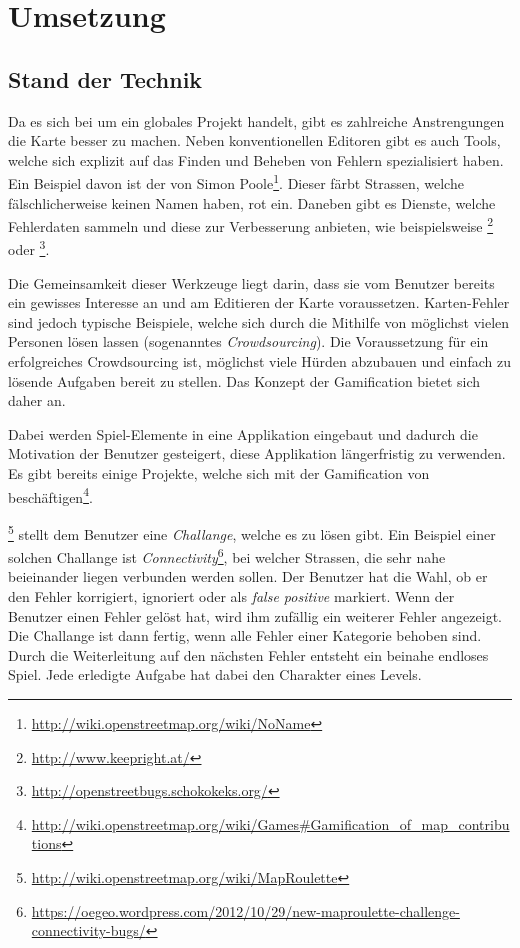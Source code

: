 \chapter{Umsetzung}
\label{umsetzung}

\section{Stand der Technik}
Da es sich bei  um ein globales Projekt handelt, gibt es zahlreiche Anstrengungen die Karte besser zu machen.
Neben konventionellen Editoren gibt es auch Tools, welche sich explizit auf das Finden und Beheben von Fehlern spezialisiert haben.
Ein Beispiel davon ist der  von Simon Poole\footnote{\url{http://wiki.openstreetmap.org/wiki/NoName}}. Dieser färbt Strassen, welche fälschlicherweise keinen Namen haben, rot ein.
Daneben gibt es Dienste, welche Fehlerdaten sammeln und diese zur Verbesserung anbieten, wie beispielsweise \footnote{\url{http://www.keepright.at/}} oder \footnote{\url{http://openstreetbugs.schokokeks.org/}}.

Die Gemeinsamkeit dieser Werkzeuge liegt darin, dass sie vom Benutzer bereits ein gewisses Interesse an  und am Editieren der Karte voraussetzen.
Karten-Fehler sind jedoch typische Beispiele, welche sich durch die Mithilfe von möglichst vielen Personen lösen lassen (sogenanntes \emph{\gls{Crowdsourcing}}).
Die Voraussetzung für ein erfolgreiches Crowdsourcing ist, möglichst viele Hürden abzubauen und einfach zu lösende Aufgaben bereit zu stellen.
Das Konzept der \gls{Gamification} bietet sich daher an.

Dabei werden Spiel-Elemente in eine Applikation eingebaut und dadurch die Motivation der Benutzer gesteigert, diese Applikation längerfristig zu verwenden.
Es gibt bereits einige Projekte, welche sich mit der \gls{Gamification} von  beschäftigen\footnote{\url{http://wiki.openstreetmap.org/wiki/Games\#Gamification_of_map_contributions}}.

\footnote{\url{http://wiki.openstreetmap.org/wiki/MapRoulette}} stellt dem Benutzer eine \emph{Challange}, welche es zu lösen gibt.
Ein Beispiel einer solchen Challange ist \emph{Connectivity}\footnote{\url{https://oegeo.wordpress.com/2012/10/29/new-maproulette-challenge-connectivity-bugs/}}, bei welcher Strassen, die sehr nahe beieinander liegen verbunden werden sollen.
Der Benutzer hat die Wahl, ob er den Fehler korrigiert, ignoriert oder als \emph{false positive} markiert.
Wenn der Benutzer einen Fehler gelöst hat, wird ihm zufällig ein weiterer Fehler angezeigt.
Die Challange ist dann fertig, wenn alle Fehler einer Kategorie behoben sind.
Durch die Weiterleitung auf den nächsten Fehler entsteht ein beinahe endloses Spiel. Jede erledigte Aufgabe hat dabei den Charakter eines Levels.

